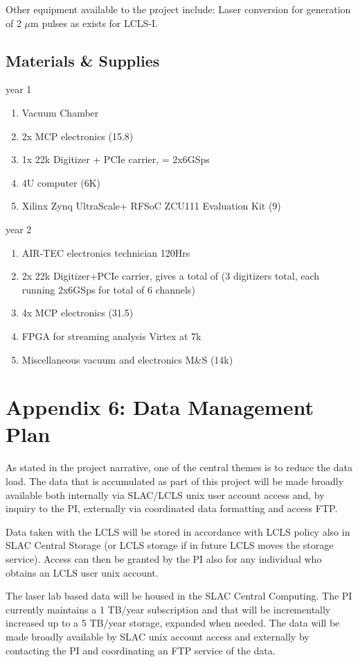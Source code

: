 \noindent Other equipment available to the project include:
Laser conversion for generation of 2 $\mu$m pulses as exists for LCLS-I.

\subsection*{Materials \& Supplies}
year 1
\begin{enumerate}
\item Vacuum Chamber 
\item 2x MCP electronics (15.8)
\item 1x 22k Digitizer + PCIe carrier, = 2x6GSps 
\item 4U computer (6K)
\item Xilinx Zynq UltraScale+ RFSoC ZCU111 Evaluation Kit (9)
\end{enumerate}

year 2
\begin{enumerate}
\item AIR-TEC electronics technician 120Hrs
\item 2x 22k Digitizer+PCIe carrier, gives a total of (3 digitizers total, each running 2x6GSps for total of 6 channels)
\item 4x MCP electronics (31.5)
\item FPGA for streaming analysis Virtex at 7k  
\item Miscellaneous vacuum and electronics M\&S (14k)
\end{enumerate}

\clearpage
\appendix
\section*{Appendix 6: Data Management Plan}

As stated in the project narrative, one of the central themes is to reduce the data load.
The data that is accumulated as part of this project will be made broadly available both internally via SLAC/LCLS unix user account access and, by inquiry to the PI, externally via coordinated data formatting and access FTP.

Data taken with the LCLS will be stored in accordance with LCLS policy also in SLAC Central Storage (or LCLS storage if in future LCLS moves the storage service).
Access can then be granted by the PI also for any individual who obtains an LCLS user unix account. 

The laser lab based data will be housed in the SLAC Central Computing.  
The PI currently maintains a 1 TB/year subscription and that will be incrementally increased up to a 5 TB/year storage, expanded when needed.
The data will be made broadly available by SLAC unix account access and externally by contacting the PI and coordinating an FTP service of the data.

